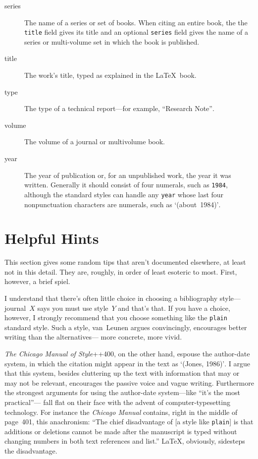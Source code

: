 \begin{description}
\item[series\hfill]
The name of a series or set of books.
When citing an entire book, the the \hbox{\tt title} field
gives its title and an optional \hbox{\tt series} field gives the
name of a series or multi-volume set
in which the book is published.

\item[title\hfill]
The work's title, typed as explained in the \LaTeX\ book.

\item[type\hfill]
The type of a technical report---for example,
``Research Note''$\!$.

\item[volume\hfill]
The volume of a journal or multivolume book.

\item[year\hfill]
The year of publication or, for
an unpublished work, the year it was written.
Generally it should consist of four numerals, such as {\tt 1984},
although the standard styles can handle any {\tt year} whose
last four nonpunctuation characters are numerals,
such as `\hbox{(about 1984)}'$\!$.

\end{description}


\section{Helpful Hints}
\label{odds-and-ends}

This section gives some random tips
that aren't documented elsewhere,
at least not in this detail.
They are, roughly, in order
of least esoteric to most.
First, however, a brief spiel.

I understand that there's often little choice in choosing
a bibliography style---journal~$X$ says you must use style~$Y$
and that's that.
If you have a choice, however, I strongly recommend that you
choose something like the {\tt plain} standard style.
Such a style, van~Leunen\cite{van-leunen} argues convincingly,
encourages better writing than the alternatives---%
more concrete, more vivid.

{\em The Chicago Manual of Style\/}\cite{chicago}++{{400}},
on the other hand,
espouse the author-date system,
in which the citation might appear in the text as `(Jones, 1986)'$\!$.
I argue that this system,
besides cluttering up the
text with information that may or may not be relevant,
encourages the passive voice and vague writing.
Furthermore the strongest arguments for
using the author-date system---like ``it's the most practical''---%
fall flat on their face with the advent
of computer-typesetting technology.
For instance the {\em Chicago Manual\/} contains,
right in the middle of page~401, this anachronism:
``The chief disadvantage of [a style like {\tt plain}] is that additions
or deletions cannot be made after the manuscript is typed without changing
numbers in both text references and list.''
\LaTeX, obviously, sidesteps the disadvantage.

